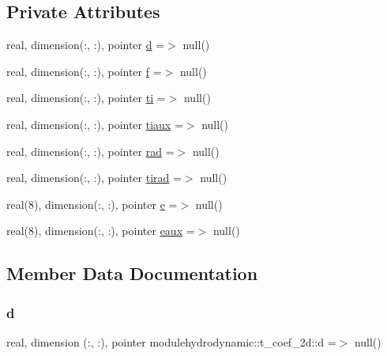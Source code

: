 \subsection*{Private Attributes}
\begin{DoxyCompactItemize}
\item 
real, dimension(\+:, \+:), pointer \mbox{\hyperlink{structmodulehydrodynamic_1_1t__coef__2d_a2faaab1b2e5d6416aeb0f6eee06ae1b0}{d}} =$>$ null()
\item 
real, dimension(\+:, \+:), pointer \mbox{\hyperlink{structmodulehydrodynamic_1_1t__coef__2d_a33433336bc23aa2d031e95d599273193}{f}} =$>$ null()
\item 
real, dimension(\+:, \+:), pointer \mbox{\hyperlink{structmodulehydrodynamic_1_1t__coef__2d_a15231849f5e2aa05bda6207204c8f32d}{ti}} =$>$ null()
\item 
real, dimension(\+:, \+:), pointer \mbox{\hyperlink{structmodulehydrodynamic_1_1t__coef__2d_ad9e591fd00ea51bf95c9a900e702b4c0}{tiaux}} =$>$ null()
\item 
real, dimension(\+:, \+:), pointer \mbox{\hyperlink{structmodulehydrodynamic_1_1t__coef__2d_a1a6d0feca41ba1b7c7715e668ba12000}{rad}} =$>$ null()
\item 
real, dimension(\+:, \+:), pointer \mbox{\hyperlink{structmodulehydrodynamic_1_1t__coef__2d_ad67792b2d82d3724c33ebe41c4c2353a}{tirad}} =$>$ null()
\item 
real(8), dimension(\+:, \+:), pointer \mbox{\hyperlink{structmodulehydrodynamic_1_1t__coef__2d_af440f1cb72ff8834a4a44d30d56955c2}{e}} =$>$ null()
\item 
real(8), dimension(\+:, \+:), pointer \mbox{\hyperlink{structmodulehydrodynamic_1_1t__coef__2d_a8ffb21785fe8ce7737485952c1685681}{eaux}} =$>$ null()
\end{DoxyCompactItemize}


\subsection{Member Data Documentation}
\mbox{\label{structmodulehydrodynamic_1_1t__coef__2d_a2faaab1b2e5d6416aeb0f6eee06ae1b0}} 
\subsubsection{\texorpdfstring{d}{d}}
{\footnotesize\ttfamily real, dimension (\+:, \+:), pointer modulehydrodynamic\+::t\+\_\+coef\+\_\+2d\+::d =$>$ null()\hspace{0.3cm}{\ttfamily [private]}}

